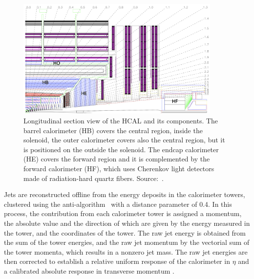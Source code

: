 \begin{figure}[htbp]
    \centering
    \includegraphics[width=0.9\textwidth]{figures_and_tables/experimental_setup/cms_hcal.png}
    \caption{Longitudinal section view of the HCAL and its components. The barrel calorimeter (HB) covers the central region, inside the solenoid, the outer calorimeter covers also the central region, but it is positioned on the outside the solenoid. The endcap calorimeter (HE) covers the forward region and it is complemented by the forward calorimeter (HF), which uses Cherenkov light detectors made of radiation-hard quartz fibers. Source:~\cite{Chatrchyan:2008zzk}.}
    \label{cms_hcal}
\end{figure}

Jets are reconstructed offline from the energy deposits in the calorimeter towers, clustered using the anti-\kt algorithm~\cite{Cacciari:2008gp, Cacciari:2011ma} with a distance parameter of 0.4. In this process, the contribution from each calorimeter tower is assigned a momentum, the absolute value and the direction of which are given by the energy measured in the tower, and the coordinates of the tower. The raw jet energy is obtained from the sum of the tower energies, and the raw jet momentum by the vectorial sum of the tower momenta, which results in a nonzero jet mass. The raw jet energies are then corrected to establish a relative uniform response of the calorimeter in $\eta$ and a calibrated absolute response in transverse momentum \pt.

